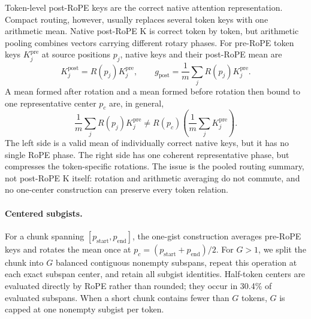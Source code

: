 \documentclass[11pt]{article}
\begin{document}
Token-level post-RoPE keys are the correct native attention representation. Compact routing,
however, usually replaces several token keys with one arithmetic mean. Native post-RoPE K is
correct token by token, but arithmetic pooling combines vectors carrying different rotary
phases. For pre-RoPE token keys $K_j^{\mathrm{pre}}$ at source positions $p_j$, native keys
and their post-RoPE mean are
\begin{equation}
 K_j^{\mathrm{post}}=R(p_j)K_j^{\mathrm{pre}},
 \qquad
 g_{\mathrm{post}}=\frac{1}{m}\sum_j R(p_j)K_j^{\mathrm{pre}}.
\end{equation}
A mean formed after rotation and a mean formed before rotation then bound to one representative
center $p_c$ are, in general,
\begin{equation}
 \boxed{
 \frac{1}{m}\sum_j R(p_j)K_j^{\mathrm{pre}}
 \ne
 R(p_c)\left(\frac{1}{m}\sum_j K_j^{\mathrm{pre}}\right).}
 \label{eq:pooling-noncommute}
\end{equation}
The left side is a valid mean of individually correct native keys, but it has no single RoPE
phase. The right side has one coherent representative phase, but compresses the token-specific
rotations. The issue is the pooled routing summary, not post-RoPE K itself: rotation and
arithmetic averaging do not commute, and no one-center construction can preserve every token
relation.

\paragraph{Centered subgists.}
For a chunk spanning $[p_{\mathrm{start}},p_{\mathrm{end}}]$, the one-gist construction
averages pre-RoPE keys and rotates the mean once at
$p_c=(p_{\mathrm{start}}+p_{\mathrm{end}})/2$. For $G>1$, we split the chunk into $G$
balanced contiguous nonempty subspans, repeat this operation at each exact subspan center,
and retain all subgist identities. Half-token centers are evaluated directly by RoPE rather
than rounded; they occur in 30.4\% of evaluated subspans. When a short chunk contains fewer
than $G$ tokens, $G$ is capped at one nonempty subgist per token.
\end{document}
